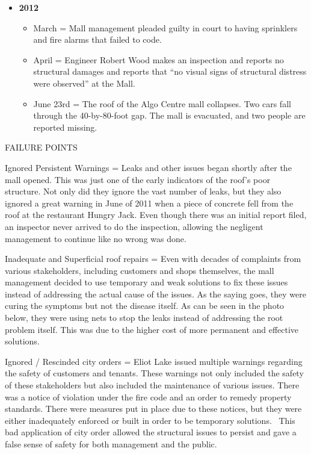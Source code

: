 \documentclass[12pt]{article}
\begin{document}
\begin{itemize}
    \item \textbf{\textbf{2012}}
    \begin{itemize}
        \item March = Mall management pleaded guilty in court to having sprinklers and fire alarms that failed to code.
        \item April = Engineer Robert Wood makes an inspection and reports no structural damages and reports that “no visual signs of structural distress were observed” at the Mall.
        \item June 23rd = The roof of the Algo Centre mall collapses. Two cars fall through the 40-by-80-foot gap. The mall is evacuated, and two people are reported missing.
    \end{itemize}
\end{itemize}


FAILURE POINTS

Ignored Persistent Warnings = Leaks and other issues began shortly after the mall opened. This was just one of the early indicators of the roof's poor structure. Not only did they ignore the vast number of leaks, but they also ignored a great warning in June of 2011 when a piece of concrete fell from the roof at the restaurant Hungry Jack. Even though there was an initial report filed, an inspector never arrived to do the inspection, allowing the negligent management to continue like no wrong was done. 
 
Inadequate and Superficial roof repairs = Even with decades of complaints from various stakeholders, including customers and shops themselves, the mall management decided to use temporary and weak solutions to fix these issues instead of addressing the actual cause of the issues. As the saying goes, they were curing the symptoms but not the disease itself. As can be seen in the photo below, they were using nets to stop the leaks instead of addressing the root problem itself. This was due to the higher cost of more permanent and effective solutions.
  

 

 
Ignored / Rescinded city orders = Eliot Lake issued multiple warnings regarding the safety of customers and tenants. These warnings not only included the safety of these stakeholders but also included the maintenance of various issues. There was a notice of violation under the fire code and an order to remedy property standards. There were measures put in place due to these notices, but they were either inadequately enforced or built in order to be temporary solutions.  This bad application of city order allowed the structural issues to persist and gave a false sense of safety for both management and the public. 
\end{document}
